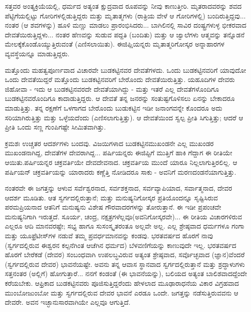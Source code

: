 ಸತ್ತವರ ಅಂತ್ಯಕ್ರಿಯೆಯಲ್ಲಿ, ಧರ್ಮದ ಅತ್ಯಂತ ಕ್ಷುದ್ರವಾದ ರೂಪವನ್ನು ನೀವು ಕಾಣುತ್ತೀರಿ. ಮೃತರಾದವರನ್ನು ಶವದ ಪೆಟ್ಟಿಗೆಯಲ್ಲಿಟ್ಟು ಗೋರಿಗಳಲ್ಲಿಡುತ್ತಿದ್ದರು ಮತ್ತು ಮೃತಾತ್ಮಗಳು (ರಾತ್ರಿಯ ವೇಳೆ ಆ ಗೋರಿಗಳಲ್ಲಿ) ಬಂದಿರುತ್ತಿದ್ದವು... ನಂತರ (ಆ ಶವಗಳನ್ನು) ಹೂಳಿ ಮಣ್ಣು ಮಾಡಲು ಪ್ರಾರಂಭಿಸಿದರು... ಬಾಗಿಲಿನಲ್ಲಿ ಸಾವಿರ ದಂಷ್ಟ್ರಗಳುಳ್ಳ ಭೀಕರವಾದ ದೇವತೆಯಿರುತ್ತಿದ್ದಳು... ನಂತರ ಹೆಣವನ್ನು ಸುಡುವ ಪದ್ದತಿ (ಬಂದಿತು) ಮತ್ತು ಆ ಜ್ವಾಲೆಗಳು ಆತ್ಮವನ್ನು ತನ್ನೊಡನೆ ಮೇಲಕ್ಕೆ\break ಕೊಂಡೊಯ್ಯುತ್ತಿರುವಂತೆ (ಎಣಿಸಲಾಯಿತು). ಈಜಿಪ್ಷಿಯನ್ನರು ಮೃತಾತ್ಮರಿಗೋಸ್ಕರ ಅನ್ನಾಹಾರಗಳ ವ್ಯವಸ್ಥೆಯನ್ನೂ ಮಾಡುತ್ತಿದ್ದರು.

ಮತ್ತೊಂದು ಮಹತ್ವಪೂರ್ಣವಾದ ವಿಚಾರವೇ ಬುಡಕಟ್ಟಿನವರ ದೇವತೆಗಳದು. ಒಂದು ಬುಡಕಟ್ಟಿನವರಿಗೆ ಯಾವುದೋ ಒಂದು ದೇವತೆಯಿದ್ದರೆ ಮತ್ತೊಂದು ಬುಡಕಟ್ಟಿನವರಿಗೆ ಬೇರೊಂದು ದೇವತೆಯಿರುತ್ತಿತ್ತು. ಯಹೂದಿಗಳ ದೇವರು ಜಿಹೋವಾ - ಇದು ಆ ಬುಡಕಟ್ಟಿನವರದೇ ದೇವತೆಯಾಗಿದ್ದು - ಮತ್ತು ಇತರೆ ಎಲ್ಲ ದೇವತೆಗಳೊಂದಿಗೂ ಬುಡಕಟ್ಟಿನವರೊಂದಿಗೂ ಕಾದಾಡುತ್ತಿದ್ದರು. ಆ ದೇವತೆ ತನ್ನ ಜನರನ್ನು ಸಂತುಷ್ಟಗೊಳಿಸಲು ಏನನ್ನು ಬೇಕಾದರೂ ಮಾಡುತ್ತಿತ್ತು. ತನ್ನ ರಕ್ಷಣೆಗೆ ಒಳಗಾಗದ ಬೇರೊಂದು ಬುಡುಕಟ್ಟಿನ ಇಡೀ ಜನಾಂಗವನ್ನೇ ಕೊಂದರೂ ಅದು ಸರಿಯಾಗಿರುತ್ತಿತ್ತು ಮತ್ತು ಒಳ್ಳೆಯದೆಂದು (ಎಣಿಸಲಾಗುತ್ತಿತ್ತು). ಆ ದೇವತೆಯಿಂದ ಸ್ವಲ್ಪ ಪ್ರೀತಿ ಸಿಗುತ್ತಿತ್ತು; ಆದರೆ ಆ ಪ್ರೀತಿ ಒಂದು ಸಣ್ಣ ಗುಂಪಿಗಷ್ಟೇ ಸೀಮಿತವಾಗಿತ್ತು.

ಕ್ರಮಶಃ ಉಚ್ಚತರ ಆದರ್ಶಗಳು ಬಂದವು. ವಿಜಯಿಗಳಾದ ಬುಡಕಟ್ಟಿನ\break ಮುಖಂಡನೇ ಎಲ್ಲ ಮುಖಂಡರ ಮುಖಂಡನಾಗಿದ್ದ, ದೇವತೆಗಳ ದೇವರಾಗಿದ್ದ... ಪರ್ಷಿಯನ್ನರು ಈಜಿಪ್ಟಿಗೆ ಮುತ್ತಿಗೆ ಹಾಕಿ ಗೆದ್ದಾಗ ಈ ರೀತಿಯೇ ಆಯಿತು.\break ಪರ್ಷಿಯನ್ನರ ಚಕ್ರವರ್ತಿಯೇ ದೇವದೇವನಾದ. ಚಕ್ರವರ್ತಿಯ ಮುಂದೆ ಯಾರೂ ನಿಲ್ಲಲಾಗುತ್ತಿರಲಿಲ್ಲ. ಆ ಪರ್ಷಿಯನ್ ಚಕ್ರವರ್ತಿಯನ್ನು ಯಾರಾದರು ಕಣ್ಣೆತ್ತಿ ನೋಡಿದರೂ ಸಾಕು - ಅವನಿಗೆ ಮರಣದಂಡನೆಯಾಗುತ್ತಿತ್ತು.

ನಂತರವೇ ಈ ಜಗತ್ತನ್ನು ಆಳುವ ಸರ್ವೆಶ್ವರನಾದ, ಸರ್ವಶಕ್ತನಾದ, ಸರ್ವವ್ಯಾಪಿಯಾದ, ಸರ್ವಾತ್ಮನಾದ, ದೇವರ ಆದರ್ಶ ಮೂಡಿತು. ಆತ ಸ್ವರ್ಗದಲ್ಲಿರುತ್ತಾನೆ; ಮತ್ತು ಮನುಷ್ಯನಿಗೋಸ್ಕರ ಪ್ರತಿಯೊಂದನ್ನೂ ಸೃಷ್ಟಿಸಿರುವ ಪರಮಪ್ರಿಯನಾದ ಆತನಿಗೆ ಮನುಷ್ಯನು ವಿಶೇಷ ಗೌರವಾದರಗಳನ್ನು ತೋರುತ್ತಾನೆ. ಈ ಇಡೀ ಪ್ರಪಂಚವೇ ಮನುಷ್ಯನಿಗಾಗಿ ಇರುತ್ತದೆ. ಸೂರ್ಯ, ಚಂದ್ರ, ನಕ್ಷತ್ರಗಳೆಲ್ಲವೂ\break (ಅವನಿಗೋಸ್ಕರವೇ)... ಈ ರೀತಿಯ ವಿಚಾರಗಳಿರುವ ಎಲ್ಲರೂ ಆದಿ ಮಾನವರಷ್ಟೇ; ಸಭ್ಯ ಹಾಗೂ ಸುಸಂಸ್ಕೃತರಂತೂ ಅಲ್ಲವೇ ಅಲ್ಲ. ಎಲ್ಲ ಶ್ರೇಷ್ಠವಾದ ಧರ್ಮಗಳೂ ಗಂಗಾ ಮತ್ತು ಯೂಫ್ರೆಟೀಸ್‌ಗಳ ನಡುವೆ ತಮ್ಮ ಪ್ರವರ್ಧಮಾನವನ್ನು ಕಂಡವು. ಭರತವರ್ಷದ ಹೊರಗೆ ನಾವು (ಸ್ವರ್ಗದಲ್ಲಿರುವ ಈಶ್ವರನ ಕಲ್ಪನೆಗಿಂತ ಆಚೆಗಿನ ಧರ್ಮದ) ಬೆಳವಣಿಗೆಯನ್ನು ಕಾಣುವುದೇ ಇಲ್ಲ. ಭರತವರ್ಷದ ಹೊರಗೆ ಬೇರೆಕಡೆ (ದೇವರ) ಸಂಬಂಧವಾಗಿ ಉಪಲಬ್ಧವಿರುವ ಅತ್ಯಂತ ಶ್ರೇಷ್ಠವಾದ, ಸರ್ವೊಚ್ಛವಾದ (ಜ್ಞಾನ)ವೆಂದರೆ (ಸ್ವರ್ಗದಲ್ಲಿರುವ ದೇವರ) ಭಾವನೆಯಷ್ಟೇ. ಅವನು ತನ್ನ ಆವಾಸ ಸ್ಥಾನವಾದ ಸ್ವರ್ಗದಲ್ಲಿರುತ್ತಾನೆ ಮತ್ತು ಶ್ರದ್ಧಾಳುಗಳು ಸತ್ತನಂತರ (ಅಲ್ಲಿಗೆ) ಹೋಗುತ್ತಾರೆ... ನನಗೆ ಕಂಡಂತೆ (ಈ ಭಾವನೆಯನ್ನು), ಬಲಿಯದ ಅತ್ಯಂತ ಬಾಲಿಶವಾದದ್ದೆಂದೇ ಕರೆಯಬೇಕು. ಆಫ್ರಿಕಾದ ಬುಡಕಟ್ಟಿನವರು ಪೂಜಿಸುತ್ತಿದ್ದರೆಂದು ಹೇಳಲಾದ ಮೂಢಾರಾಧನೆಯ ವಿಕಾರ ವಿಗ್ರಹವಾದ ಮುಂಬೋಜುಂಬೋ ಮತ್ತು ಸ್ವರ್ಗದಲ್ಲಿರುವ ದೇವರ ಭಾವನೆ ಎರಡೂ ಒಂದೇ. ಜಗತ್ತನ್ನು ನಡೆಸುತ್ತಿರುವವನು ಆ ದೇವರೇ. ಅವನ ಇಚ್ಛಾನುಸಾರವಾಗಿಯೇ ಎಲ್ಲವೂ ಆಗುತ್ತಿದೆ.

